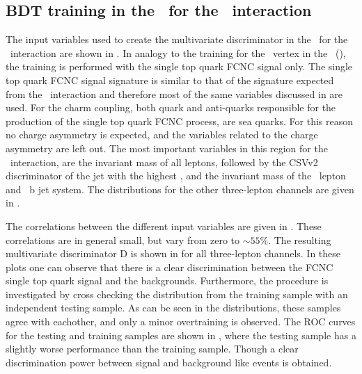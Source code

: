 \clearpage	
\subsection{BDT training in the \STSR\ for the \Zct\ interaction}
\label{sec:BDTSTSRZCT}
The input variables used to create the multivariate discriminator in the \STSR\ for the \Zct\ interaction are shown in . In analogy to the training for the \Zut\ vertex in the \STSR\ (), the training is performed with the single top quark FCNC signal only. The single top quark FCNC  signal signature is similar to that of the signature expected from the \Zut\ interaction and therefore most of the same variables discussed in  are used. For the charm coupling, both quark and anti-quarks responsible for the production of the single top quark FCNC process, are sea quarks. For this reason no charge asymmetry is expected, and the variables related to the charge asymmetry are left out.
 The most important variables in this region for the \Zct\ interaction,  are the invariant mass of all leptons,  followed by the CSVv2 discriminator of the jet with the highest \pt, and the invariant mass of the \PW\ lepton and \SM\ b jet system. The distributions for the other three-lepton channels are given in .
 
 
The correlations between the different input variables are given in . These correlations are in general small, but vary from zero to $\sim 55\%$.
The resulting multivariate discriminator D is shown in  for all three-lepton channels. In these plots one can observe that there is a clear discrimination between the FCNC single top quark signal and the backgrounds. Furthermore, the procedure is investigated by cross checking the distribution from the training sample with an independent testing sample. As can be seen in the distributions, these samples agree with eachother, and only a minor overtraining is observed. The ROC curves for the testing and training samples are shown in , where the testing sample has a slightly worse performance than the training sample. Though a clear discrimination power between signal and background like events is obtained. 

